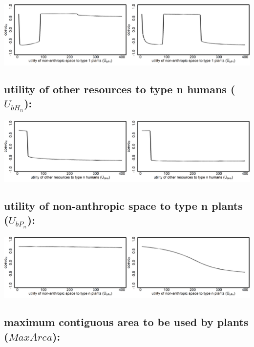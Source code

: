 \documentclass[
]{book}
\begin{document}
\includegraphics[width=1\linewidth]{plots/2_onePar-U.bP1_bifplot-pair}

\hypertarget{utility-of-other-resources-to-type-n-humans-u_bh_n}{%
\subsection{\texorpdfstring{utility \textbf{of} other resources \textbf{to} type n humans (\(U_{bH_{n}}\)):}{utility of other resources to type n humans (U\_\{bH\_\{n\}\}):}}\label{utility-of-other-resources-to-type-n-humans-u_bh_n}}

\includegraphics[width=1\linewidth]{plots/2_onePar-U.bHn_bifplot-pair}

\hypertarget{utility-of-non-anthropic-space-to-type-n-plants-u_bp_n}{%
\subsection{\texorpdfstring{utility \textbf{of} non-anthropic space \textbf{to} type n plants (\(U_{bP_{n}}\)):}{utility of non-anthropic space to type n plants (U\_\{bP\_\{n\}\}):}}\label{utility-of-non-anthropic-space-to-type-n-plants-u_bp_n}}

\includegraphics[width=1\linewidth]{plots/2_onePar-U.bPn_bifplot-pair}

\hypertarget{maximum-contiguous-area-to-be-used-by-plants-maxarea}{%
\subsection{\texorpdfstring{maximum contiguous area to be used by plants (\(MaxArea\)):}{maximum contiguous area to be used by plants (MaxArea):}}\label{maximum-contiguous-area-to-be-used-by-plants-maxarea}}
\end{document}
